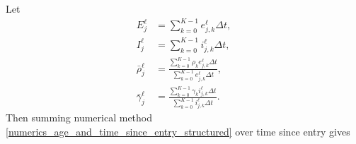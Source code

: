 \documentclass[USenglish]{article}
\begin{document}
Let
\begin{subequations}
  \begin{align}
    E_j^{\ell}
    &= \sum_{k = 0}^{K - 1} e_{j, k}^{\ell} \Delta t,
    \\
    I_j^{\ell}
    &= \sum_{k = 0}^{K - 1} i_{j, k}^{\ell} \Delta t,
    \\
    \bar{\rho}_j^{\ell}
    &= \frac{\sum_{k = 0}^{K - 1} \rho_k e_{j, k}^{\ell} \Delta t}
      {\sum_{k = 0}^{K - 1} e_{j, k}^{\ell} \Delta t},
    \\
    \bar{\gamma}_j^{\ell}
    &= \frac{\sum_{k = 0}^{K - 1} \gamma_k i_{j, k}^{\ell} \Delta t}
      {\sum_{k = 0}^{K - 1} i_{j, k}^{\ell} \Delta t}.
  \end{align}
\end{subequations}
Then summing numerical method
\eqref{numerics_age_and_time_since_entry_structured} over time since
entry gives
\end{document}
